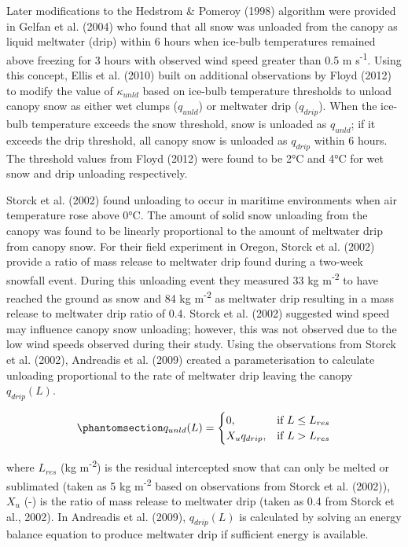 \documentclass[
  letterpaper,
]{tex/uofsthesis-cs}
\begin{document}
Later modifications to the Hedstrom \& Pomeroy (1998) algorithm were
provided in Gelfan et al. (2004) who found that all snow was unloaded
from the canopy as liquid meltwater (drip) within 6 hours when ice-bulb
temperatures remained above freezing for 3 hours with observed wind
speed greater than 0.5 m s\textsuperscript{-1}. Using this concept,
Ellis et al. (2010) built on additional observations by Floyd (2012) to
modify the value of \(\kappa_{unld}\) based on ice-bulb temperature
thresholds to unload canopy snow as either wet clumps (\(q_{unld}\)) or
meltwater drip (\(q_{drip}\)). When the ice-bulb temperature exceeds the
snow threshold, snow is unloaded as \(q_{unld}\); if it exceeds the drip
threshold, all canopy snow is unloaded as \(q_{drip}\) within 6 hours.
The threshold values from Floyd (2012) were found to be 2°C and 4°C for
wet snow and drip unloading respectively.

Storck et al. (2002) found unloading to occur in maritime environments
when air temperature rose above 0°C. The amount of solid snow unloading
from the canopy was found to be linearly proportional to the amount of
meltwater drip from canopy snow. For their field experiment in Oregon,
Storck et al. (2002) provide a ratio of mass release to meltwater drip
found during a two-week snowfall event. During this unloading event they
measured 33 kg m\textsuperscript{-2} to have reached the ground as snow
and 84 kg m\textsuperscript{-2} as meltwater drip resulting in a mass
release to meltwater drip ratio of 0.4. Storck et al. (2002) suggested
wind speed may influence canopy snow unloading; however, this was not
observed due to the low wind speeds observed during their study. Using
the observations from Storck et al. (2002), Andreadis et al. (2009)
created a parameterisation to calculate unloading proportional to the
rate of meltwater drip leaving the canopy \(q_{drip}(L)\).

\begin{equation}\phantomsection\label{eq-sa-unload-dudt}{
q_{unld}(L) = \begin{cases}
    0,& \text{if } L \le L_{res} \\
    X_u q_{drip},              & \text{if }  L > L_{res}
\end{cases}
}\end{equation}

where \(L_{res}\) (kg m\textsuperscript{-2}) is the residual intercepted
snow that can only be melted or sublimated (taken as 5 kg
m\textsuperscript{-2} based on observations from Storck et al. (2002)),
\(X_u\) (-) is the ratio of mass release to meltwater drip (taken as 0.4
from Storck et al., 2002). In Andreadis et al. (2009), \(q_{drip}(L)\)
is calculated by solving an energy balance equation to produce meltwater
drip if sufficient energy is available.
\end{document}
